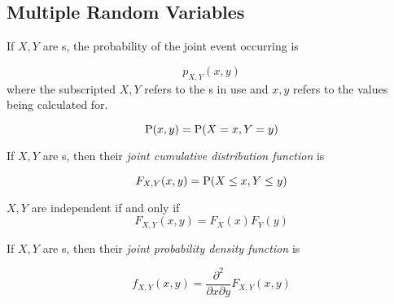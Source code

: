 \subsection{Multiple Random Variables}\label{subsec:Multiple_Random_Variables}
\begin{definition}\label{def:Joint_Probability_Distribution}
  If $X, Y$ are s, the probability of the joint event occurring is
  
  \begin{equation}\label{eq:Joint_Probability_Event}
    p_{X,Y}(x,y)
  \end{equation}
  where the subscripted $X,Y$ refers to the s in use and $x,y$ refers to the values being calculated for.
  
  \begin{equation}\label{eq:Joint_Probability_Distribution}
    \operatorname{\operatorname{P}}(x, y) = \operatorname{\operatorname{P}}(X=x, Y=y)
  \end{equation}
\end{definition}

\begin{definition}\label{def:Joint_CDF}
  If $X, Y$ are s, then their \emph{joint cumulative distribution function} is

  \begin{equation}\label{eq:Joint_CDF}
    F_{X,Y}(x,y) = \operatorname{\operatorname{P}}(X \leq x, Y \leq y)
  \end{equation}

  \begin{remark}\label{rmk:Independent_Multiple_Random_Variables}
    $X, Y$ are independent if and only if
    \begin{equation}\label{eq:Independent_Multiple_Random_Variables}
      F_{X,Y}(x, y) = F_{X}(x) F_{Y}(y)
    \end{equation}
  \end{remark}
\end{definition}

\begin{definition}\label{def:Joint_PDF}
  If $X, Y$ are s, then their \emph{joint probability density function} is

  \begin{equation}\label{eq:Joint_PDF}
    f_{X,Y}(x,y) = \frac{\partial^{2}}{\partial x \partial y} F_{X,Y}(x,y) 
  \end{equation}
\end{definition}


